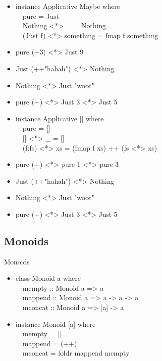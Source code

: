 \documentclass{beamer}                  %
\newcommand{\srule}{
	\rule{\textwidth}{1pt}\\
}
\newlength{\subsecwidth}
\newenvironment{slide}{
	\begin{frame} %
	\settowidth{\subsecwidth}{\insertsubsection} %
	\ifthenelse{\dimtest{\subsecwidth}{<}{1pt}}{ %
		\frametitle{\insertsection\\             %
		\vspace{-1ex}                            %
		\color{fore}\srule                       %
		\par                                     %
		\vspace{-3ex}                            %
		}
	}{                                           %
		\frametitle{\insertsection\ -- \insertsubsection\\ %
		\vspace{-1ex}                            %
		\color{fore}\srule                       %
		\par                                     %
		\vspace{-3ex}                            %
		}
	}
	\Large                                       %
}{
	\end{frame}
}
\begin{document}
\begin{slide}
  \begin{itemize}
    \item
      instance Applicative Maybe where\\
      ~~pure = Just\\
      ~~Nothing <*> \_ = Nothing\\
      ~~(Just f) <*> something = fmap f something
    \item pure (+3) <*> Just 9
    \item Just (++"hahah") <*> Nothing
    \item Nothing <*> Just "woot"
    \item pure (+) <*> Just 3 <*> Just 5
  \end{itemize}
\end{slide}

\begin{slide}
  \begin{itemize}
    \item
      instance Applicative [] where\\
      ~~pure = []\\
      ~~[] <*> \_ = []\\
      ~~(f:fs) <*> xs = (fmap f xs) ++ (fs <*> xs)
    \item pure (+) <*> pure 1 <*> pure 3
    \item Just (++"hahah") <*> Nothing
    \item Nothing <*> Just "woot"
    \item pure (+) <*> Just 3 <*> Just 5
  \end{itemize}
\end{slide}

\subsection{Monoids}

\begin{slide}
  Monoids
  \begin{itemize}
    \item
      class Monoid a where\\
      ~~mempty :: Monoid a => a\\
      ~~mappend :: Monoid a => a -> a -> a\\
      ~~mconcat :: Monoid a => [a] -> a
    \item
      instance Monoid [a] where\\
      ~~mempty = []\\
      ~~mappend = (++)\\
      ~~mconcat = foldr mappend mempty
  \end{itemize}
\end{slide}
\end{document}
